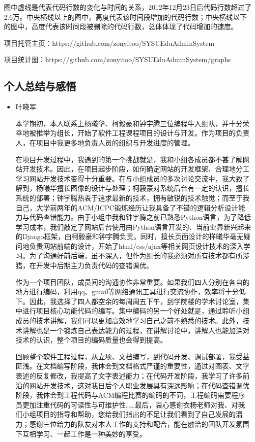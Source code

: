 图中虚线是代表代码行数的变化与时间的关系，2012年12月23日后代码行数超过了2.6万。中央横线以上的图中，高度代表该时间段增加的代码行数；中央横线以下的图中，高度代表该时间段被删除的代码行数，总体体现了代码增加的速度。\vspace{2em}

项目托管主页：https://github.com/zonyitoo/SYSUEduAdminSystem

项目统计图：https://github.com/zonyitoo/SYSUEduAdminSystem/graphs

\subsection{个人总结与感悟}
\begin{itemize}
  \item 叶晓军
  
  \CJKindent 本学期初，本人联系上杨曦华、柯毅豪和钟宇腾三位编程牛人组队，并十分荣幸地被推举为组长，开始了软件工程课程项目的设计与开发。作为项目的负责人，在项目中我更多地负责人员的组织与开发进度的管理。
  
  \CJKindent 在项目开发过程中，我遇到的第一个挑战就是，我和小组各成员都不甚了解网站开发技术。因此，在项目起步阶段，如何确定网站的开发框架、合理地分工学习网站开发技术变得十分重要。在与小组成员的多次讨论交流中，我大致了解到，杨曦华擅长图像的设计与处理；柯毅豪对系统后台有一定的认识，擅长系统的部署；钟宇腾热衷于追求最新的技术，拥有敏锐的技术触觉；而至于我自己，大学前两年的ACM/ICPC锻炼经历让我具备了不错的逻辑分析设计能力与代码查错能力。由于小组中我和钟宇腾之前已熟悉Python语言，为了降低学习成本，我们敲定了网站后台使用由Python语言开发的、当前业界新兴起来的Django框架，由柯毅豪和钟宇腾负责。同时，擅长页面设计的样曦华毫无疑问地负责网站前端的设计，开始了html/css/ajax等相关网页设计技术的深入学习。为了沟通好前后端，虽不深入，但作为组长的我必须对所有技术都有所涉猎，在开发中后期主力负责代码的查错调优。
  
  \CJKindent 作为一个项目团队，成员间的沟通协作非常重要。如果我们四人分别在各自的地方进行编码，利用qq、gmail等网络通讯工具进行交流协作，效率将十分低下。因此，我选择了四人都空余的每周周五下午，到学院楼的学术讨论室，集中进行项目核心功能代码的编写。集中编码的另一个好处就是，通过聆听小组成员的技术讲解，我们可以更加高效地学习自己之前不熟悉的技术。此外，技术讲解也是一个锻炼自己表达能力的过程，在讲解讨论中，讲解人也能加深对技术的认识，整个项目的编码质量也会得到提高。
  
  \CJKindent 回顾整个软件工程过程，从立项、文档编写，到代码开发、调试部署，我受益匪浅。在文档编写阶段，我体会到文档格式严谨的重要性，通过对图表、文字表述的反复修改，我提高了文字表述能力；在代码开发阶段，我学习了许多前沿的网站开发技术，这对我日后个人职业发展具有深远影响；在代码查错调优阶段，我体会到工程代码与ACM编程比赛的编码的不同，工程编码需要程序员更加注重代码的可读性与可维护性……最后，衷心感谢衣杨老师对我、对我们小组项目的指导和帮助，您给我们指出的不足让我们看到了自己发展的潜力；感谢三位给力的队友对本人工作的支持和配合，能在融洽的团队开发氛围下互相学习、一起工作是一种美妙的享受。
  

\end{itemize}
